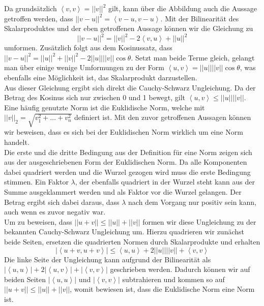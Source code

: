 Da grundsätzlich $\left\langle v,v\right\rangle  = ||v||^2$ gilt, kann über die Abbildung auch die Aussage getroffen werden, dass $||v-u||^2 = \left\langle v-u,v-u\right\rangle $. Mit der Bilinearität des Skalarproduktes und der eben getroffenen Aussage können wir die Gleichung zu 
\begin{equation*}
||v-u||^2 = ||v||^2 - 2\left\langle v,u\right\rangle  + ||u||^2 
\end{equation*}
umformen.
Zusätzlich folgt aus dem Kosinussatz, dass $||v-u||^2 = ||u||^2 + ||v||^2 - 2 ||u|| ||v|| \cos\theta$. Setzt man beide Terme gleich, gelangt man über einige wenige Umformungen zu der Form $\left\langle u,v\right\rangle  = ||u|| ||v|| \cos\theta$, was ebenfalls eine Möglichkeit ist, das Skalarprodukt darzustellen.\\
Aus dieser Gleichung ergibt sich direkt die Cauchy-Schwarz Ungleichung. Da der Betrag des Kosinus sich nur zwischen 0 und 1 bewegt, gilt $\left\langle u,v\right\rangle  \leq ||u|| ||v||$.\\
Eine häufig genutzte Norm ist die Euklidische Norm, welche mit $||v||_2 = \sqrt{v_1^2 + \dots + v_n^2}$ definiert ist. Mit den zuvor getroffenen Aussagen können wir beweisen, dass es sich bei der Euklidischen Norm wirklich um eine Norm handelt.\\
Die erste und die dritte Bedingung aus der Definition für eine Norm zeigen sich aus der ausgeschriebenen Form der Euklidischen Norm. Da alle Komponenten dabei quadriert werden und die Wurzel gezogen wird muss die erste Bedingung stimmen. Ein Faktor $\lambda$, der ebenfalls quadriert in der Wurzel steht kann aus der Summe ausgeklammert werden und als Faktor vor die Wurzel gelangen. Der Betrag ergibt sich dabei daraus, dass $\lambda$ nach dem Vorgang nur positiv sein kann, auch wenn es zuvor negativ war.\\
Um zu beweisen, dass $||u+v|| \leq ||u|| + ||v||$ formen wir diese Ungleichung zu der bekannten Cauchy-Schwarz Ungleichung um. Hierzu quadrieren wir zunächst beide Seiten, ersetzen die quadrierten Normen durch Skalarprodukte und erhalten 
\begin{equation*}
|\left\langle u+v,u+v\right\rangle | \leq \left\langle u,u\right\rangle  + 2 ||u|| ||v|| + \left\langle v,v\right\rangle 
\end{equation*}
Die linke Seite der Ungleichung kann aufgrund der Bilinearität als $|\left\langle u,u\right\rangle | + 2 |\left\langle u,v\right\rangle | + |\left\langle v,v\right\rangle |$ geschrieben werden. Dadurch können wir auf beiden Seiten $|\left\langle u,u\right\rangle |$ und $|\left\langle v,v\right\rangle |$ subtrahieren und kommen so auf $||u+v|| \leq ||u|| + ||v||$, womit bewiesen ist, dass die Euklidische Norm eine Norm ist.

%